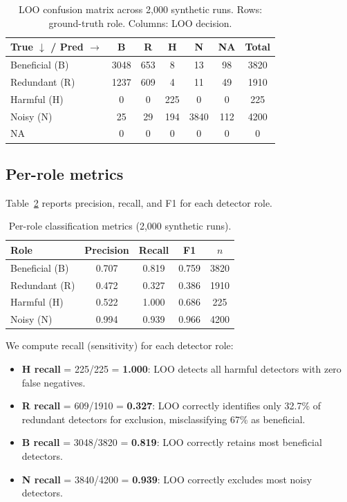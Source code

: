 \begin{table}[h]
\centering
\caption{LOO confusion matrix across 2,000 synthetic runs. Rows: ground-truth role. Columns: LOO decision.}
\label{tab:confusion_matrix}
\begin{tabular}{lccccc|c}
\toprule
True $\downarrow$ / Pred $\rightarrow$ & B & R & H & N & NA & Total \\
\midrule
Beneficial (B) & 3048 & 653 & 8 & 13 & 98 & 3820 \\
Redundant (R) & 1237 & 609 & 4 & 11 & 49 & 1910 \\
Harmful (H) & 0 & 0 & 225 & 0 & 0 & 225 \\
Noisy (N) & 25 & 29 & 194 & 3840 & 112 & 4200 \\
NA & 0 & 0 & 0 & 0 & 0 & 0 \\
\bottomrule
\end{tabular}
\end{table}

\subsection{Per-role metrics}

Table~\ref{tab:per_role} reports precision, recall, and F1 for each detector role.

\begin{table}[h]
\centering
\caption{Per-role classification metrics (2,000 synthetic runs).}
\label{tab:per_role}
\begin{tabular}{lcccc}
\toprule
Role & Precision & Recall & F1 & $n$ \\
\midrule
Beneficial (B) & 0.707 & 0.819 & 0.759 & 3820 \\
Redundant (R) & 0.472 & 0.327 & 0.386 & 1910 \\
Harmful (H) & 0.522 & 1.000 & 0.686 & 225 \\
Noisy (N) & 0.994 & 0.939 & 0.966 & 4200 \\
\bottomrule
\end{tabular}
\end{table}

We compute recall (sensitivity) for each detector role:

\begin{itemize}
\item \textbf{H recall} = 225/225 = \textbf{1.000}: LOO detects all harmful detectors with zero false negatives.
\item \textbf{R recall} = 609/1910 = \textbf{0.327}: LOO correctly identifies only 32.7\% of redundant detectors for exclusion, misclassifying 67\% as beneficial.
\item \textbf{B recall} = 3048/3820 = \textbf{0.819}: LOO correctly retains most beneficial detectors.
\item \textbf{N recall} = 3840/4200 = \textbf{0.939}: LOO correctly excludes most noisy detectors.
\end{itemize}

